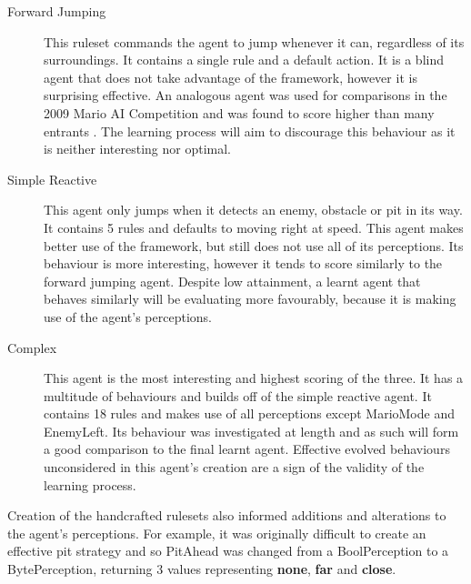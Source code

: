 \begin{description}
	\item[Forward Jumping] This ruleset commands the agent to jump whenever it can, regardless of its surroundings. It contains a single rule and a default action. It is a blind agent that does not take advantage of the framework, however it is surprising effective. An analogous agent was used for comparisons in the 2009 Mario AI Competition and was found to score higher than many entrants \cite[p.~7]{2010the}. The learning process will aim to discourage this behaviour as it is neither interesting nor optimal.
	\item[Simple Reactive] This agent only jumps when it detects an enemy, obstacle or pit in its way. It contains 5 rules and defaults to moving right at speed. This agent makes better use of the framework, but still does not use all of its perceptions. Its behaviour is more interesting, however it tends to score similarly to the forward jumping agent. Despite low attainment, a learnt agent that behaves similarly will be evaluating more favourably, because it is making use of the agent's perceptions.
	\item[Complex] This agent is the most interesting and highest scoring of the three. It has a multitude of behaviours and builds off of the simple reactive agent. It contains 18 rules and makes use of all perceptions except MarioMode and EnemyLeft. Its behaviour was investigated at length and as such will form a good comparison to the final learnt agent. Effective evolved behaviours unconsidered in this agent's creation are a sign of the validity of the learning process. 
\end{description}
Creation of the handcrafted rulesets also informed additions and alterations to the agent's perceptions. For example, it was originally difficult to create an effective pit strategy and so PitAhead was changed from a BoolPerception to a BytePerception, returning 3 values representing \textbf{none}, \textbf{far} and \textbf{close}.


